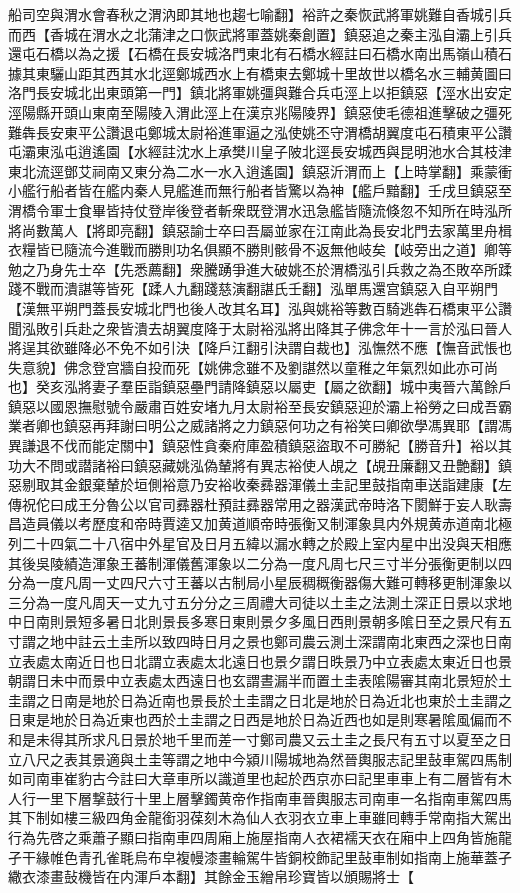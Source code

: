 船司空與渭水會春秋之渭汭即其地也趨七喻翻】裕許之秦恢武將軍姚難自香城引兵而西【香城在渭水之北蒲津之口恢武將軍蓋姚秦創置】鎮惡追之秦主泓自灞上引兵還屯石橋以為之援【石橋在長安城洛門東北有石橋水經註曰石橋水南出馬嶺山積石據其東驪山距其西其水北逕鄭城西水上有橋東去鄭城十里故世以橋名水三輔黄圖曰洛門長安城北出東頭第一門】鎮北將軍姚彊與難合兵屯涇上以拒鎮惡【涇水出安定涇陽縣开頭山東南至陽陵入渭此涇上在漢京兆陽陵界】鎮惡使毛德祖進擊破之彊死難犇長安東平公讚退屯鄭城太尉裕進軍逼之泓使姚丕守渭橋胡翼度屯石積東平公讚屯灞東泓屯逍遙園【水經註沈水上承樊川皇子陂北逕長安城西與昆明池水合其枝津東北流逕鄧艾祠南又東分為二水一水入逍遙園】鎮惡沂渭而上【上時掌翻】乘蒙衝小艦行船者皆在艦内秦人見艦進而無行船者皆驚以為神【艦戶黯翻】壬戌旦鎮惡至渭橋令軍士食畢皆持仗登岸後登者斬衆既登渭水迅急艦皆隨流倏忽不知所在時泓所將尚數萬人【將即亮翻】鎮惡諭士卒曰吾屬並家在江南此為長安北門去家萬里舟楫衣糧皆已隨流今進戰而勝則功名俱顯不勝則骸骨不返無他岐矣【岐旁出之道】卿等勉之乃身先士卒【先悉薦翻】衆騰踴爭進大破姚丕於渭橋泓引兵救之為丕敗卒所蹂踐不戰而潰諶等皆死【蹂人九翻踐慈演翻諶氏壬翻】泓單馬還宫鎮惡入自平朔門【漢無平朔門蓋長安城北門也後人改其名耳】泓與姚裕等數百騎逃犇石橋東平公讚聞泓敗引兵赴之衆皆潰去胡翼度降于太尉裕泓將出降其子佛念年十一言於泓曰晉人將逞其欲雖降必不免不如引決【降戶江翻引決謂自裁也】泓憮然不應【憮音武悵也失意貌】佛念登宫牆自投而死【姚佛念雖不及劉諶然以童稚之年氣烈如此亦可尚也】癸亥泓將妻子羣臣詣鎮惡壘門請降鎮惡以屬吏【屬之欲翻】城中夷晉六萬餘戶鎮惡以國恩撫慰號令嚴肅百姓安堵九月太尉裕至長安鎮惡迎於灞上裕勞之曰成吾霸業者卿也鎮惡再拜謝曰明公之威諸將之力鎮惡何功之有裕笑曰卿欲學馮異耶【謂馮異謙退不伐而能定關中】鎮惡性貪秦府庫盈積鎮惡盜取不可勝紀【勝音升】裕以其功大不問或譛諸裕曰鎮惡藏姚泓偽輦將有異志裕使人覘之【覘丑廉翻又丑艶翻】鎮惡剔取其金銀棄輦於垣側裕意乃安裕收秦彞器渾儀土圭記里鼓指南車送詣建康【左傳祝佗曰成王分魯公以官司彞器杜預註彞器常用之器漢武帝時洛下閡鮮于妄人耿壽昌造員儀以考歷度和帝時賈逵又加黄道順帝時張衡又制渾象具内外規黄赤道南北極列二十四氣二十八宿中外星官及日月五緯以漏水轉之於殿上室内星中出没與天相應其後吳陵績造渾象王蕃制渾儀舊渾象以二分為一度凡周七尺三寸半分張衡更制以四分為一度凡周一丈四尺六寸王蕃以古制局小星辰稠穊衡器傷大難可轉移更制渾象以三分為一度凡周天一丈九寸五分分之三周禮大司徒以土圭之法測土深正日景以求地中日南則景短多暑日北則景長多寒日東則景夕多風日西則景朝多隂日至之景尺有五寸謂之地中註云土圭所以致四時日月之景也鄭司農云測土深謂南北東西之深也日南立表處太南近日也日北謂立表處太北遠日也景夕謂日昳景乃中立表處太東近日也景朝謂日未中而景中立表處太西遠日也玄謂晝漏半而置土圭表隂陽審其南北景短於土圭謂之日南是地於日為近南也景長於土圭謂之日北是地於日為近北也東於土圭謂之日東是地於日為近東也西於土圭謂之日西是地於日為近西也如是則寒暑隂風偏而不和是未得其所求凡日景於地千里而差一寸鄭司農又云土圭之長尺有五寸以夏至之日立八尺之表其景適與土圭等謂之地中今潁川陽城地為然晉輿服志記里鼔車駕四馬制如司南車崔豹古今註曰大章車所以識道里也起於西京亦曰記里車車上有二層皆有木人行一里下層撃鼓行十里上層擊鐲黄帝作指南車晉輿服志司南車一名指南車駕四馬其下制如樓三級四角金龍銜羽葆刻木為仙人衣羽衣立車上車雖囘轉手常南指大駕出行為先啓之乘蕭子顯曰指南車四周廂上施屋指南人衣裙襦天衣在廂中上四角皆施龍孑干緣帷色青孔雀毦烏布皁複幔漆畫輪駕牛皆銅校飾記里鼔車制如指南上施華蓋孑繖衣漆畫鼔機皆在内渾戶本翻】其餘金玉繒帛珍寶皆以頒賜將士【